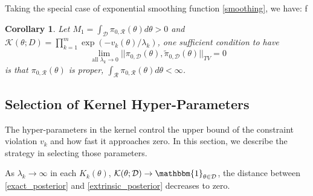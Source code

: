 \documentclass[10pt]{article}
\newcommand{\leo}[1]{{\color{blue}{LD: #1}}}
\newtheorem{corollary}{Corollary}
\newcommand{\mc}[1]{\mathcal{#1}}
\DeclareMathOperator{\1}{\mathbbm{1}}
\begin{document}
Taking the special case of exponential smoothing function \eqref{smoothing}, we have:
f
\begin{corollary}
Let $M_1= \int_{\mc D} \pi_{0,\mc R}(\theta)d\theta>0$ and $\mc K(\theta; D) = \prod_{k=1}^m \exp( -v_k(\theta)/\lambda_k)$, one sufficient condition to have
$$\lim_{\text{ all } \lambda_k\rightarrow 0}||\pi_{0,\mc D}(\theta), \tilde{\pi}_{0,\mc D}(\theta) ||_{TV} = 0$$
is that $\pi_{0,\mc R}(\theta)$ is proper, $\int_{\mc R} \pi_{0,\mc R}(\theta) d\theta<\infty$.
\end{corollary}
\leo{via DCT}

\subsection{Selection of Kernel Hyper-Parameters}

The hyper-parameters in the kernel control the upper bound of the constraint violation $v_k$ and how fast it approaches zero. In this section, we describe the strategy in selecting those parameters.

As $\lambda_k\rightarrow \infty$ in each $K_k(\theta)$, $\mc{K}(\theta; \mc D)\rightarrow \mathbbm{1}_{\theta\in \mc D}$, the distance between \eqref{exact_posterior} and \eqref{extrinsic_posterior} decreases to zero.


\end{document}
